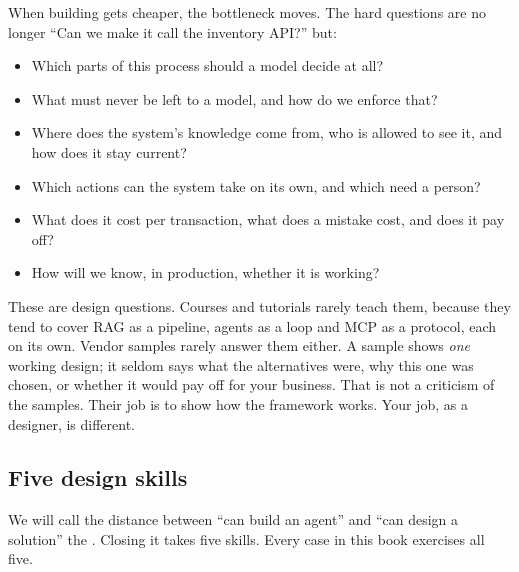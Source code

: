 When building gets cheaper, the bottleneck moves. The hard questions are no longer ``Can we make it call the inventory API?'' but:
\begin{itemize}[itemsep=1pt]
  \item Which parts of this process should a model decide at all?
  \item What must never be left to a model, and how do we enforce that?
  \item Where does the system's knowledge come from, who is allowed to see it, and how does it stay current?
  \item Which actions can the system take on its own, and which need a person?
  \item What does it cost per transaction, what does a mistake cost, and does it pay off?
  \item How will we know, in production, whether it is working?
\end{itemize}
These are design questions. Courses and tutorials rarely teach them, because they tend to cover RAG as a pipeline, agents as a loop and MCP as a protocol, each on its own. Vendor samples rarely answer them either. A sample shows \emph{one} working design; it seldom says what the alternatives were, why this one was chosen, or whether it would pay off for your business. That is not a criticism of the samples. Their job is to show how the framework works. Your job, as a designer, is different.

\subsection{Five design skills}

We will call the distance between ``can build an agent'' and ``can design a solution'' the . Closing it takes five skills. Every case in this book exercises all five.


